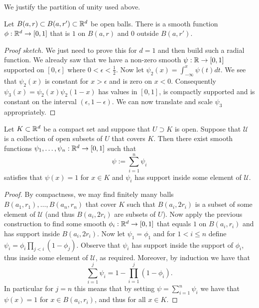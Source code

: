 \documentclass[twoside, a4paper, 10pt]{amsart}
\begin{document}
We justify the partition of unity used above.

\begin{prop} Let $B(a,r) \subset B(a,r') \subset \mathbb{R}^d$ be open balls. There is a smooth function $\phi:\mathbb{R}^d \to [0,1]$ that is $1$ on $B(a,r)$ and $0$ outside $B(a,r')$. 
\end{prop}

\begin{proof}[Proof sketch] We just need to prove this for $d=1$ and then build such a radial function. We already saw that we have a non-zero smooth $\psi:\mathbb{R} \to [0,1]$ supported on $[0,\epsilon]$ where $0<\epsilon<\frac{1}{2}$. Now let $\psi_2(x) = \int_{-\infty}^x \psi(t) dt$. We see that $\psi_2(x)$ is constant for $x>\epsilon$ and is zero on $x<0$. Consequently $\psi_3(x) = \psi_2(x) \psi_2(1-x)$ has values in $[0,1]$, is compactly supported and is constant on the interval $(\epsilon, 1 - \epsilon)$. We can now translate and scale $\psi_3$ appropriately. \end{proof}

\begin{prop} Let $K \subset \mathbb{R}^d$ be a compact set and suppose that $U \supset K$ is open. Suppose that $\mathcal{U}$ is a collection of open subsets of $U$ that covers $K$. Then there exist smooth functions $\psi_1, \ldots, \psi_n:\mathbb{R}^d \to [0,1]$ such that $$\psi := \sum_{i=1}^n \psi_i$$ satisfies that $\psi(x)=1$ for $x \in K$ and $\psi_i$ has support inside some element of $\mathcal{U}$.

\end{prop}

\begin{proof} By compactness, we may find finitely many balls $B(a_1,r_1), \ldots , B(a_n,r_n)$ that cover $K$ such that $B(a_i,2r_i)$ is a subset of some element of $\mathcal{U}$ (and thus $B(a_i, 2r_i)$ are subsets of $U$). Now apply the previous construction to find some smooth $\phi_i:\mathbb{R}^d \to [0,1]$ that equals $1$ on $B(a_i,r_i)$ and has support inside $B(a_i,2r_i)$. Now let $\psi_1 = \phi_1$ and for $1<i\leq n$ define $\psi_i = \phi_i \prod_{j<i} (1 - \phi_j)$. Observe that $\psi_i$ has support inside the support of $\phi_i$, thus inside some element of $\mathcal{U}$, as required. Moreover, by induction we have that $$\sum_{i=1}^j \psi_i = 1 - \prod_{i=1}^j (1-\phi_i).$$ In particular for $j=n$ this means that by setting $\psi = \sum_{i=1}^n \psi_i$ we have that $\psi(x) = 1$ for $x \in B(a_ i, r_i)$, and thus for all $x \in K$.  \end{proof}
\end{document}
